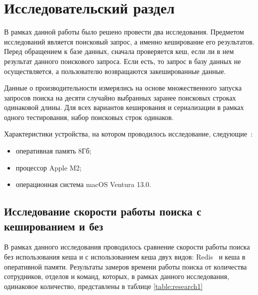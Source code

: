\chapter{Исследовательский раздел}

В рамках данной работы было решено провести два исследования. Предметом исследований является поисковый запрос, а именно кеширование его результатов. Перед обращением к базе данных, сначала проверяется кеш, если ли в нем результат данного поискового запроса. Если есть, то запрос в базу данных не осуществляется, а пользователю возвращаются закешированные данные. 

Данные о производительности измерялись на основе множественного запуска запросов поиска на десяти случайно выбранных заранее поисковых строках одинаковой длины. Для всех вариантов кеширования и сериализации в рамках одного тестирования, набор поисковых строк одинаков.

Характеристики устройства, на котором проводилось исследование, следующие~\cite{macbook}:

\begin{itemize}
	\item оперативная память 8Гб;
	\item процессор Apple M2;
	\item операционная система macOS Ventura 13.0.
\end{itemize}

\section{Исследование скорости работы поиска с кешированием и без}
В рамках данного исследования проводилось сравнение скорости работы поиска без использования кеша и с использованием кеша двух видов: Redis~\cite{redis} и кеша в оперативной памяти. Результаты замеров времени работы поиска от количества сотрудников, отделов и команд, которых, в рамках данного исследования, одинаковое количество, представлены в таблице \ref{table:research1}

